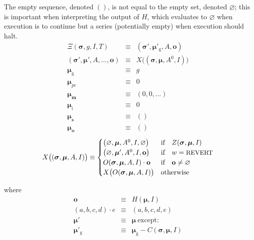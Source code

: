 \documentclass[9pt,oneside]{amsart}
\begin{document}
\begin{multicols}{2}
\hypertarget{empty_sequence_vs_empty_set}{}The empty sequence, denoted $()$, is not equal to the empty set, denoted $\varnothing$; this is important when interpreting the output of $H$, which evaluates to $\varnothing$ when execution is to continue but a series (potentially empty) when execution should halt.
\begin{eqnarray}
\Xi(\boldsymbol{\sigma}, g, I, T) & \equiv & (\boldsymbol{\sigma}'\!, \boldsymbol{\mu}'_{\mathrm{g}}, A, \mathbf{o}) \\
(\boldsymbol{\sigma}', \boldsymbol{\mu}'\!, A, ..., \mathbf{o}) & \equiv & X\big((\boldsymbol{\sigma}, \boldsymbol{\mu}, A^0\!, I)\big) \\
\boldsymbol{\mu}_{\mathrm{g}} & \equiv & g \\
\boldsymbol{\mu}_{pc} & \equiv & 0 \\
\boldsymbol{\mu}_{\mathbf{m}} & \equiv & (0, 0, ...) \\
\boldsymbol{\mu}_{\mathrm{i}} & \equiv & 0 \\
\boldsymbol{\mu}_{\mathbf{s}} & \equiv & () \\
\boldsymbol{\mu}_{\mathbf{o}} & \equiv & ()
\end{eqnarray}
\begin{equation} \label{eq:X-def}
X\big( (\boldsymbol{\sigma}, \boldsymbol{\mu}, A, I) \big) \equiv \begin{cases}
\big(\varnothing, \boldsymbol{\mu}, A^0, I, \varnothing\big) & \text{if} \quad Z(\boldsymbol{\sigma}, \boldsymbol{\mu}, I) \\
\big(\varnothing, \boldsymbol{\mu}', A^0, I, \mathbf{o}\big) & \text{if} \quad w = \text{\small REVERT} \\
O(\boldsymbol{\sigma}, \boldsymbol{\mu}, A, I) \cdot \mathbf{o} & \text{if} \quad \mathbf{o} \neq \varnothing \\
X\big(O(\boldsymbol{\sigma}, \boldsymbol{\mu}, A, I)\big) & \text{otherwise} \\
\end{cases}
\end{equation}

where
\begin{eqnarray}
\mathbf{o} & \equiv & H(\boldsymbol{\mu}, I) \\
(a, b, c, d) \cdot e & \equiv & (a, b, c, d, e) \\
\boldsymbol{\mu}' & \equiv & \boldsymbol{\mu}\ \text{except:} \\
\boldsymbol{\mu}'_{\mathrm{g}} & \equiv & \boldsymbol{\mu}_{\mathrm{g}} - C(\boldsymbol{\sigma}, \boldsymbol{\mu}, I)
\end{eqnarray}


\end{multicols}
\end{document}
